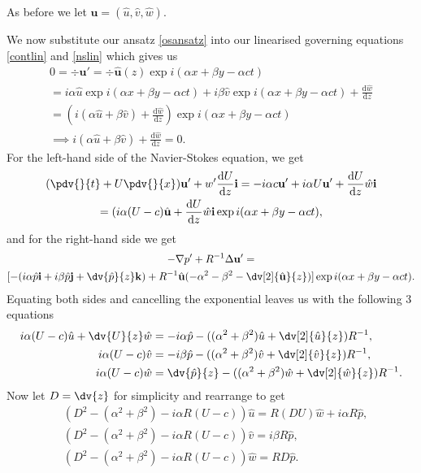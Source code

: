 As before we let $ \hat{\mathbf{u}} = ( \hat{u}, \hat{v}, \hat{w} ) $.

We now substitute our ansatz \eqref{osansatz} into our linearised governing equations \eqref{contlin} and \eqref{nslin} which gives us
\begin{gather}
    0 = \div \mathbf{u}' = \div \hat{\mathbf{u}}(z) \exp{i(\alpha x + \beta y - \alpha c t)} \nonumber\\
    = i \alpha \hat{u} \exp{i(\alpha x + \beta y - \alpha c t)} + i \beta \hat{v} \exp{i(\alpha x + \beta y - \alpha c t)} + \frac{\text{d}\hat{w}}{\text{d}z} \nonumber\\
    = (i(\alpha \hat{u} + \beta \hat{v}) + \frac{\text{d}\hat{w}}{\text{d}z})\exp{i(\alpha x + \beta y - \alpha c t)} \nonumber\\
    \implies i(\alpha \hat{u} + \beta \hat{v}) + \frac{\text{d}\hat{w}}{\text{d}z} = 0.
\label{os1}
\end{gather}
For the left-hand side of the Navier-Stokes equation, we get
\begin{gather}
    (\pdv{}{t} + U \pdv{}{x}) \mathbf{u}' + w' \frac{\text{d}U}{\text{d}z} \mathbf{i} = -i \alpha c \mathbf{u}' + i \alpha U \mathbf{u}' + \frac{\text{d}U}{\text{d}z} \hat{w} \mathbf{i} \nonumber\\
    = (i \alpha ( U - c) \hat{\mathbf{u}} + \frac{\text{d}U}{\text{d}z} \hat{w} \mathbf{i} \exp{i(\alpha x + \beta y - \alpha c t)},
\end{gather}
and for the right-hand side we get
\begin{gather}
    -\nabla p' + R^{-1} \Delta \mathbf{u}' = \nonumber\\ [-(i \alpha \hat{p} \mathbf{i} + i \beta \hat{p} \mathbf{j} + \dv{\hat{p}}{z} \mathbf{k}) + R^{-1} \hat{\mathbf{u}} (- \alpha^2 - \beta^2 - \dv[2]{\hat{\mathbf{u}}}{z})] \exp{i(\alpha x + \beta y - \alpha c t)}.
\end{gather}
Equating both sides and cancelling the exponential leaves us with the following 3 equations
\begin{subequations}
\begin{align}
    i \alpha (U - c) \hat{u} + \dv{U}{z} \hat{w} &= -i \alpha \hat{p} - ((\alpha^2 + \beta^2)\hat{u} + \dv[2]{\hat{u}}{z}) R^{-1}, \\
    i \alpha (U - c) \hat{v} &= -i \beta \hat{p} - ((\alpha^2 + \beta^2)\hat{v} + \dv[2]{\hat{v}}{z}) R^{-1}, \\
    i \alpha (U - c) \hat{w} &= \dv{\hat{p}}{z} - ((\alpha^2 + \beta^2)\hat{w} + \dv[2]{\hat{w}}{z}) R^{-1}.
\end{align}   
\end{subequations}
Now let $ D = \dv{z} $ for simplicity and rearrange to get
\begin{subequations}
\begin{align}
    &(D^2 - (\alpha^2+\beta^2) - i \alpha R (U - c)) \hat{u} = R (DU) \hat{w} + i \alpha R \hat{p}, \label{os2}\\
    &(D^2 - (\alpha^2+\beta^2) - i \alpha R (U - c)) \hat{v} = i \beta R \hat{p}, \label{os3}\\
    &(D^2 - (\alpha^2+\beta^2) - i \alpha R (U - c)) \hat{w} = R D \hat{p} \label{os4}.
\end{align}
\end{subequations}
